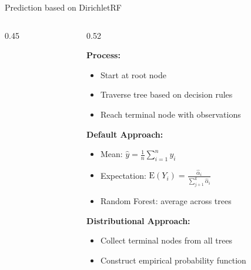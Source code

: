 \begin{frame}{Prediction based on DirichletRF}
\begin{columns}[T]
\begin{column}{0.45\textwidth}
\begin{tikzpicture}
\end{tikzpicture}
\end{column}

\begin{column}{0.52\textwidth}
\small

\textbf{Process:}
\begin{itemize}[label=\arabic*.]
    \item Start at root node
    \item Traverse tree based on decision rules
    \item Reach terminal node with observations
\end{itemize}

\vspace{0.4cm}

\textbf{Default Approach:}
\begin{itemize}
    \item Mean: $\hat{y} = \frac{1}{n}\sum_{i=1}^{n} y_i$
    \item Expectation: $\text{E}(Y_i) = \frac{\hat{\alpha}_i}{\sum_{j+1}^k\hat{\alpha}_i}$
    \item Random Forest: average across trees
\end{itemize}

\vspace{0.4cm}

\textbf{Distributional Approach:}
\begin{itemize}
    \item Collect terminal nodes from all trees
    \item Construct empirical probability function
\end{itemize}

\end{column}

\end{columns}

\end{frame}










